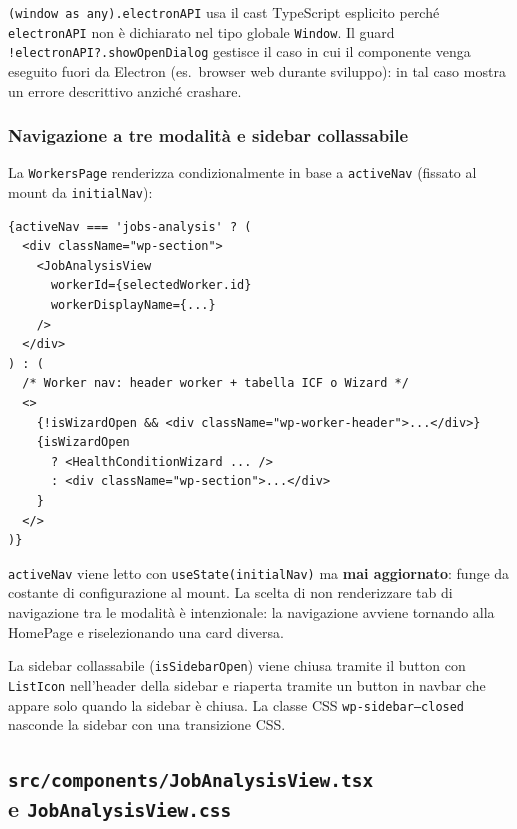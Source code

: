 \documentclass[a4paper,12pt]{article}
\begin{document}
\texttt{(window as any).electronAPI} usa il cast TypeScript esplicito
perch\'{e} \texttt{electronAPI} non \`{e} dichiarato nel tipo globale
\texttt{Window}. Il guard \texttt{!electronAPI?.showOpenDialog} gestisce
il caso in cui il componente venga eseguito fuori da Electron
(es.\ browser web durante sviluppo): in tal caso mostra un errore
descrittivo anzich\'{e} crashare.

\subsubsection{Navigazione a tre modalit\`{a} e sidebar collassabile}

La \texttt{WorkersPage} renderizza condizionalmente in base a
\texttt{activeNav} (fissato al mount da \texttt{initialNav}):

\begin{lstlisting}
{activeNav === 'jobs-analysis' ? (
  <div className="wp-section">
    <JobAnalysisView
      workerId={selectedWorker.id}
      workerDisplayName={...}
    />
  </div>
) : (
  /* Worker nav: header worker + tabella ICF o Wizard */
  <>
    {!isWizardOpen && <div className="wp-worker-header">...</div>}
    {isWizardOpen
      ? <HealthConditionWizard ... />
      : <div className="wp-section">...</div>
    }
  </>
)}
\end{lstlisting}

\noindent \texttt{activeNav} viene letto con \texttt{useState(initialNav)} ma
\textbf{mai aggiornato}: funge da costante di configurazione al mount.
La scelta di non renderizzare tab di navigazione tra le modalit\`{a}
\`{e} intenzionale: la navigazione avviene tornando alla HomePage e
riselezionando una card diversa.

La sidebar collassabile (\texttt{isSidebarOpen}) viene chiusa tramite
il button con \texttt{ListIcon} nell'header della sidebar e riaperta
tramite un button in navbar che appare solo quando la sidebar \`{e}
chiusa. La classe CSS \texttt{wp-sidebar--closed} nasconde la sidebar
con una transizione CSS.

\subsection[\texttt{src/components/JobAnalysisView.tsx} e \texttt{JobAnalysisView.css}]{\texttt{src/components/JobAnalysisView.tsx}\\[2pt]e \texttt{JobAnalysisView.css}}
\end{document}

